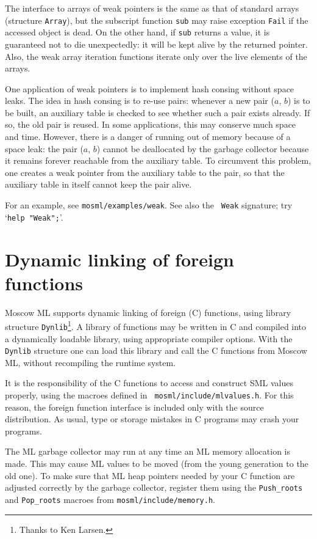 \documentclass[fleqn]{article}
\begin{document}
The interface to arrays of weak pointers is the same as that of
standard arrays (structure {\tt Array}), but the subscript function
{\tt sub} may raise exception {\tt Fail} if the accessed object is
dead.  On the other hand, if {\tt sub} returns a value, it is
guaranteed not to die unexpectedly: it will be kept alive by the
returned pointer.  Also, the weak array iteration functions iterate
only over the live elements of the arrays.

One application of weak pointers is to implement hash consing without
space leaks.  The idea in hash consing is to re-use pairs: whenever a
new pair ($a$, $b$) is to be built, an auxiliary table is checked to
see whether such a pair exists already.  If so, the old pair is
reused.  In some applications, this may conserve much space and time.
However, there is a danger of running out of memory because of a space
leak: the pair ($a$, $b$) cannot be deallocated by the garbage
collector because it remains forever reachable from the auxiliary
table.  To circumvent this problem, one creates a weak pointer from
the auxiliary table to the pair, so that the auxiliary table in itself
cannot keep the pair alive.

For an example, see {\tt mosml/examples/weak}.  See also the {\tt
  Weak} signature; try `{\tt help "Weak";}'.


\section{Dynamic linking of foreign functions}
\label{sec-dynamic-linking}

Moscow ML supports dynamic linking of foreign (C) functions, using
library structure {\tt Dynlib}\footnote{Thanks to Ken Larsen.}.  A
library of functions may be written in C and compiled into a
dynamically loadable library, using appropriate compiler options.
With the {\tt Dynlib} structure one can load this library and call the
C functions from Moscow ML, without recompiling the runtime system.

It is the responsibility of the C functions to access and construct
SML values properly, using the macroes defined in {\tt
  mosml/include/mlvalues.h}.  For this reason, the foreign
function interface is included only with the source distribution.  As
usual, type or storage mistakes in C programs may crash your programs.

The ML garbage collector may run at any time an ML memory allocation
is made.  This may cause ML values to be moved (from the young
generation to the old one).  To make sure that ML heap pointers needed
by your C function are adjusted correctly by the garbage collector,
register them using the \verb+Push_roots+ and \verb+Pop_roots+ macroes
from {\tt mosml/include/memory.h}.
\end{document}
